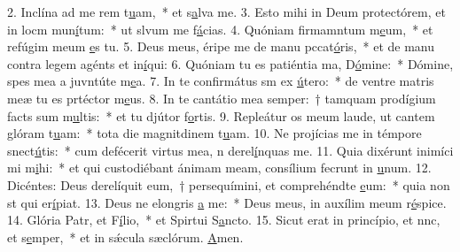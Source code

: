 2. Inclína ad me rem t\uline{u}am,~* et s\uline{a}lva me.
3. Esto mihi in Deum protectórem, et in locm mun\uline{í}tum:~* ut slvum me f\uline{á}cias.
4. Quóniam firmamntum m\uline{e}um,~* et refúgim meum \uline{e}s tu.
5. Deus meus, éripe me de manu pccat\uline{ó}ris,~* et de manu contra legem agénts et in\uline{í}qui:
6. Quóniam tu es patiéntia ma, D\uline{ó}mine:~* Dómine, spes mea a juvntúte m\uline{e}a.
7. In te confirmátus sm ex \uline{ú}tero:~* de ventre matris meæ tu es prtéctor m\uline{e}us.
8. In te cantátio mea semper:~† tamquam prodígium facts sum m\uline{u}ltis:~* et tu djútor f\uline{o}rtis.
9. Repleátur os meum laude, ut cantem glóram t\uline{u}am:~* tota die magnitdinem t\uline{u}am.
10. Ne projícias me in témpore snect\uline{ú}tis:~* cum defécerit virtus mea, n derel\uline{í}nquas me.
11. Quia dixérunt inimíci mi m\uline{i}hi:~* et qui custodiébant ánimam meam, consílium fecrunt in \uline{u}num.
12. Dicéntes: Deus derelíquit eum,~† persequímini, et comprehéndte \uline{e}um:~* quia non st qui er\uline{í}piat.
13. Deus ne elongris \uline{a} me:~* Deus meus, in auxílim meum r\uline{é}spice.
14. Glória Patr, et F\uline{í}lio,~* et Spirtui S\uline{a}ncto.
15. Sicut erat in princípio, et nnc, et s\uline{e}mper,~* et in sǽcula sæclórum. \uline{A}men.
